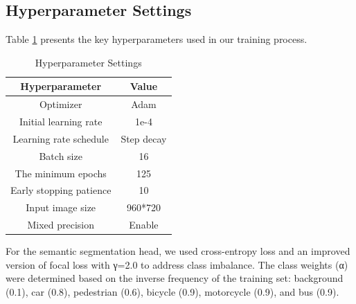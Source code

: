 \documentclass[conference]{IEEEtran}
\begin{document}
\subsection{Hyperparameter Settings}

Table \ref{tab:hyperparams} presents the key hyperparameters used in our training process.

\begin{table}[htbp]
    \caption{Hyperparameter Settings}
    \label{tab:hyperparams}
    \centering
    \begin{tabular}{cc}
    \hline
    \textbf{Hyperparameter} & \textbf{Value} \\
    \hline
    Optimizer & Adam \\
    Initial learning rate & 1e-4 \\
    Learning rate schedule & Step decay \\
    Batch size & 16 \\
    The minimum epochs & 125 \\
    Early stopping patience & 10 \\
    Input image size & 960*720 \\
    Mixed precision & Enable \\
    \hline
    \end{tabular}
    \end{table}






For the semantic segmentation head, we used cross-entropy loss and an improved version of focal loss with γ=2.0 to address class imbalance. The class weights (α) were determined based on the inverse frequency of the training set: background (0.1), car (0.8), pedestrian (0.6), bicycle (0.9), motorcycle (0.9), and bus (0.9).
\end{document}

